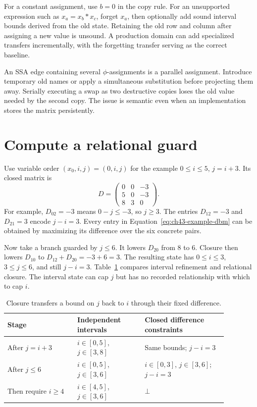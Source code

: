 For a constant assignment, use $b=0$ in the copy rule.
For an unsupported expression such as $x_a=x_b*x_c$, forget $x_a$, then optionally add sound interval bounds derived from the old state.
Retaining the old row and column after assigning a new value is unsound.
A production domain can add specialized transfers incrementally, with the forgetting transfer serving as the correct baseline.

An SSA edge containing several $\phi$-assignments is a parallel assignment.
Introduce temporary old names or apply a simultaneous substitution before projecting them away.
Serially executing a swap as two destructive copies loses the old value needed by the second copy.
The issue is semantic even when an implementation stores the matrix persistently.

\section{Compute a relational guard}
\label{sec:ch43-worked}

Use variable order $(x_0,i,j)=(0,i,j)$ for the example $0\leq i\leq5$, $j=i+3$.
Its closed matrix is
\begin{equation}
 D=\begin{pmatrix}
 0&0&-3\\
 5&0&-3\\
 8&3&0
 \end{pmatrix}.
 \label{eq:ch43-example-dbm}
\end{equation}
For example, $D_{02}=-3$ means $0-j\leq-3$, so $j\geq3$.
The entries $D_{12}=-3$ and $D_{21}=3$ encode $j-i=3$.
Every entry in Equation~\ref{eq:ch43-example-dbm} can be obtained by maximizing its difference over the six concrete pairs.

Now take a branch guarded by $j\leq6$.
It lowers $D_{20}$ from $8$ to $6$.
Closure then lowers $D_{10}$ to $D_{12}+D_{20}=-3+6=3$.
The resulting state has $0\leq i\leq3$, $3\leq j\leq6$, and still $j-i=3$.
Table~\ref{tab:ch43-bounds} compares interval refinement and relational closure.
The interval state can cap $j$ but has no recorded relationship with which to cap $i$.

\begin{table}
\centering
\caption{Closure transfers a bound on $j$ back to $i$ through their fixed difference.}
\label{tab:ch43-bounds}
\begin{tabular}{p{0.28\linewidth}p{0.27\linewidth}p{0.33\linewidth}}
\toprule
Stage & Independent intervals & Closed difference constraints \\
\midrule
After $j=i+3$ & $i\in[0,5]$, $j\in[3,8]$ & Same bounds; $j-i=3$ \\
After $j\leq6$ & $i\in[0,5]$, $j\in[3,6]$ & $i\in[0,3]$, $j\in[3,6]$; $j-i=3$ \\
Then require $i\geq4$ & $i\in[4,5]$, $j\in[3,6]$ & $\bot$ \\
\bottomrule
\end{tabular}
\end{table}

